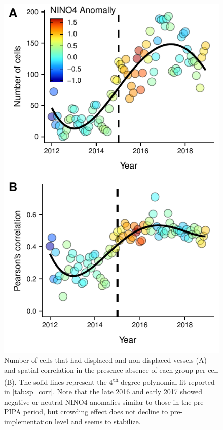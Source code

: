 \documentclass[12pt]{article}
\begin{document}
\begin{landscape}

\end{landscape}

\begin{figure}[htbp]
\centering
\includegraphics{img/sp_corr.pdf}
\caption{\label{fig:sp_corr}Number of cells that had displaced and non-displaced vessels (A) and spatial correlation in the presence-absence of each group per cell (B). The solid lines represent the 4\textsuperscript{th} degree polynomial fit reported in \ref{tab:sp_corr}. Note that the late 2016 and early 2017 showed negative or neutral NINO4 anomalies similar to those in the pre-PIPA period, but crowding effect does not decline to pre-implementation level and seems to stabilize.}
\end{figure}
\end{document}
